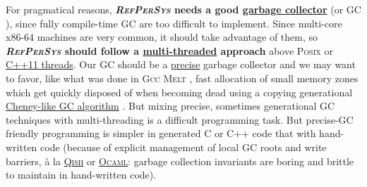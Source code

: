 \documentclass{IEEEtran}
\newcommand{\RefPerSys}{{\textit{\textsc{RefPerSys}}}}
\begin{document}
For pragmatical reasons, \textbf{{\RefPerSys} needs a good
  \href{https://en.wikipedia.org/wiki/Tracing\_garbage\_collection}{garbage
    collector}} (or GC \cite{appel:1991:garbage,
  wilson:1992:uniprocessorgc, baker:1995:cons,
  jones:2016:gchandbook}), since fully compile-time GC
\cite{mazur:2004:compile} are too difficult to implement. Since
multi-core x86-64 machines are very common, it should take advantage
of them, so \textbf{{\RefPerSys} should follow a
  \href{https://en.wikipedia.org/wiki/Thread_(computing)}{multi-threaded}
  approach} above \textsc{Posix} \cite{barney:2010:pthreads} or
\href{https://en.cppreference.com/w/cpp/thread}{C++11 threads}. Our GC
should be a
\href{https://en.wikipedia.org/wiki/Tracing_garbage_collection#Precise_vs._conservative_and_internal_pointers}{precise}
garbage collector \cite{Rafkind:2009:PreciseGC} and we may want to
favor, like what was done in \textsc{Gcc Melt}
\cite{Starynkevitch:2007:Multistage, Starynkevitch-DSL2011,
  Starynkevitch-GCCMELTweb}, fast allocation of small memory zones
which get quickly disposed of when becoming dead using a copying
generational
\href{https://en.wikipedia.org/wiki/Cheney's\_algorithm}{Cheney-like
  GC algorithm} \cite{wilson:1992:uniprocessorgc}.  But mixing
precise, sometimes generational GC techniques with multi-threading is
a difficult programming task. But precise-GC friendly programming is
simpler in generated C or C++ code that with hand-written code
(because of explicit management of local GC roots and write barriers,
à la
\href{http://starynkevitch.net/Basile/qishintro.html}{\textsc{Qish}}
or
\href{https://caml.inria.fr/pub/docs/manual-ocaml/intfc.html}{\textsc{Ocaml}}:
garbage collection invariants are boring and brittle to maintain in
hand-written code).
\end{document}
